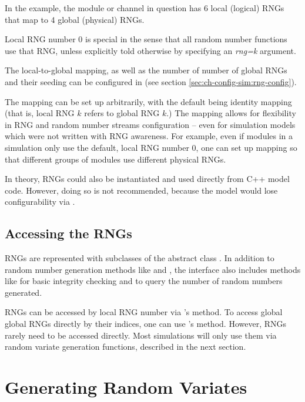 In the example, the module or channel in question has 6 local (logical)
RNGs that map to 4 global (physical) RNGs.

\begin{note}
Local RNG number 0 is special in the sense that all random number functions
use that RNG, unless explicitly told otherwise by specifying an \textit{rng=k}
argument.
\end{note}

The local-to-global mapping, as well as the number of number of global
RNGs and their seeding can be configured in  (see
section \ref{sec:ch-config-sim:rng-config}).

The mapping can be set up arbitrarily, with the default being identity
mapping (that is, local RNG $k$ refers to global RNG $k$.) The mapping
allows for flexibility in RNG and random number streams configuration
-- even for simulation models which were not written with RNG awareness.
For example, even if modules in a simulation only use the default, local
RNG number 0, one can set up mapping so that different groups of modules
use different physical RNGs.

In theory, RNGs could also be instantiated and used directly from C++ model
code. However, doing so is not recommended, because the model would lose
configurability via .

\subsection{Accessing the RNGs}

RNGs are represented with subclasses of the abstract class .
In addition to random number generation methods like  and
, the  interface also includes methods like
 for basic integrity checking and 
to query the number of random numbers generated.

RNGs can be accessed by local RNG number via 's
 method. To access global global RNGs directly by their
indices, one can use 's  method.
However, RNGs rarely need to be accessed directly. Most simulations will
only use them via random variate generation functions, described in the
next section.


\section{Generating Random Variates}
\label{cha:sim-lib:random-variate-generation}

